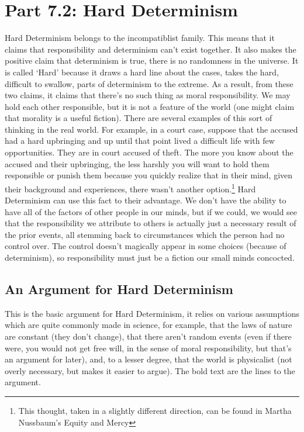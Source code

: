 \section{Part 7.2: Hard Determinism}

Hard Determinism belongs to the incompatiblist family. This means that it claims that responsibility and determinism can't exist together. It also makes the positive claim that determinism is true, there is no randomness in the universe. It is called `Hard' because it draws a hard line about the cases, takes the hard, difficult to swallow, parts of determinism to the extreme. As a result, from these two claims, it claims that there’s no such thing as moral responsibility. We may hold each other responsible, but it is not a feature of the world (one might claim that morality is a useful fiction). There are several examples of this sort of thinking in the real world. For example, in a court case, suppose that the accused had a hard upbringing and up until that point lived a difficult life with few opportunities. They are in court accused of theft. The more you know about the accused and their upbringing, the less harshly you will want to hold them responsible or punish them because you quickly realize that in their mind, given their background and experiences, there wasn't another option.\footnote{This thought, taken in a slightly different direction, can be found in Martha Nussbaum's Equity and Mercy} Hard Determinism can use this fact to their advantage. We don't have the ability to have all of the factors of other people in our minds, but if we could, we would see that the responsibility we attribute to others is actually just a necessary result of the prior events, all stemming back to circumstances which the person had no control over. The control doesn't magically appear in some choices (because of determinism), so responsibility must just be a fiction our small minds concocted.

\subsection{An Argument for Hard Determinism}
This is the basic argument for Hard Determinism, it relies on various assumptions which are quite commonly made in science, for example, that the laws of nature are constant (they don't change), that there aren't random events (even if there were, you would not get free will, in the sense of moral responsibility, but that's an argument for later), and, to a lesser degree, that the world is physicalist (not overly necessary, but makes it easier to argue).  The bold text are the lines to the argument.
